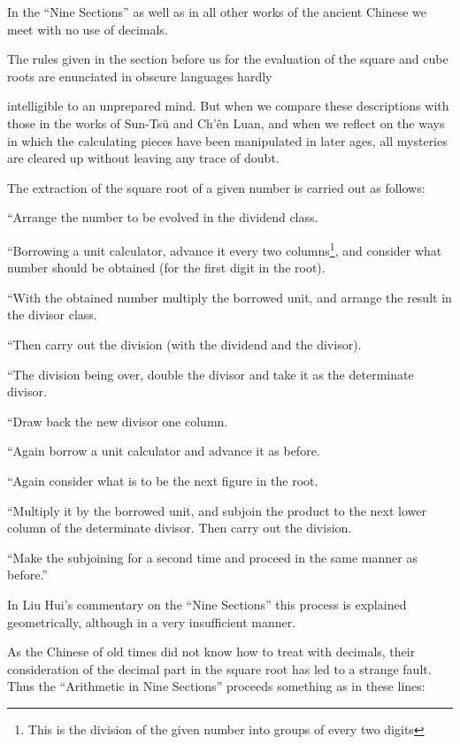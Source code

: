 \documentclass[11pt]{article}
\newcommand{\scanpage}[2]{\clearpage\setcounter{footnote}{0}\noindent{\footnotesize\color{gray}PDF page #1 · #2}\par\medskip}
\newcommand{\scanfooter}{}
\begin{document}
In the ``Nine Sections'' as well as in all other works of the ancient Chinese we meet with no use of decimals.

The rules given in the section before us for the evaluation of the square and cube roots are enunciated in obscure languages hardly
\scanfooter

\scanpage{0027}{Chapter 3, printed page 13}
\setcounter{footnote}{0}
intelligible to an unprepared mind. But when we compare these descriptions with those in the works of Sun-Tsŭ and Ch'ên Luan, and when we reflect on the ways in which the calculating pieces have been manipulated in later ages, all mysteries are cleared up without leaving any trace of doubt.

The extraction of the square root of a given number is carried out as follows:

``Arrange the number to be evolved in the dividend class.

``Borrowing a unit calculator, advance it every two columns\footnote{This is the division of the given number into groups of every two digits}, and consider what number should be obtained (for the first digit in the root).

``With the obtained number multiply the borrowed unit, and arrange the result in the divisor class.

``Then carry out the division (with the dividend and the divisor).

``The division being over, double the divisor and take it as the determinate divisor.

``Draw back the new divisor one column.

``Again borrow a unit calculator and advance it as before.

``Again consider what is to be the next figure in the root.

``Multiply it by the borrowed unit, and subjoin the product to the next lower column of the determinate divisor. Then carry out the division.

``Make the subjoining for a second time and proceed in the same manner as before.''

In Liu Hui's commentary on the ``Nine Sections'' this process is explained geometrically, although in a very insufficient manner.

As the Chinese of old times did not know how to treat with decimals, their consideration of the decimal part in the square root has led to a strange fault. Thus the ``Arithmetic in Nine Sections'' proceeds something as in these lines:
\end{document}
